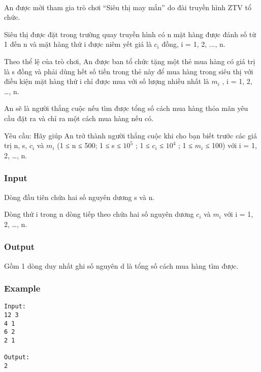 

 

An được mời tham gia trò chơi “Siêu thị may mắn” do đài truyền hình ZTV tổ chức.

Siêu thị được đặt trong trường quay truyền hình có n mặt hàng được đánh số từ 1 đến n và mặt hàng thứ i được niêm yết giá là $c_{i}$ đồng, i = 1, 2, ..., n.

Theo thể lệ của trò chơi, An được ban tổ chức tặng một thẻ mua hàng có giá trị là s đồng và phải dùng hết số tiền trong thẻ này để mua hàng trong siêu thị với điều kiện mặt hàng thứ i chỉ được mua với số lượng nhiều nhất là $m_{i}$ , i = 1, 2, …, n.

An sẽ là người thắng cuộc nếu tìm được tổng số cách mua hàng thỏa mãn yêu cầu đặt ra và chỉ ra một cách mua hàng nếu có.

Yêu cầu: Hãy giúp An trở thành người thắng cuộc khi cho bạn biết trước các giá trị n, s, $c_{i}$ và $m_{i}$ (1 ≤ n ≤ 500; 1 ≤ s ≤ $10^{5}$ ; 1 ≤ $c_{i}$ ≤ $10^{4}$ ; 1 ≤ $m_{i}$ ≤ 100) với i = 1, 2, …, n.

\subsubsection{Input}

Dòng đầu tiên chứa hai số nguyên dương s và n.

Dòng thứ i trong n dòng tiếp theo chứa hai số nguyên dương $c_{i}$ và $m_{i}$ với i = 1, 2, …, n.

\subsubsection{Output}

Gồm 1 dòng duy nhất ghi số nguyên d là tổng số cách mua hàng tìm được.

\subsubsection{Example}
\begin{verbatim}
Input:
12 3
4 1
6 2
2 1

Output:
2
\end{verbatim}
